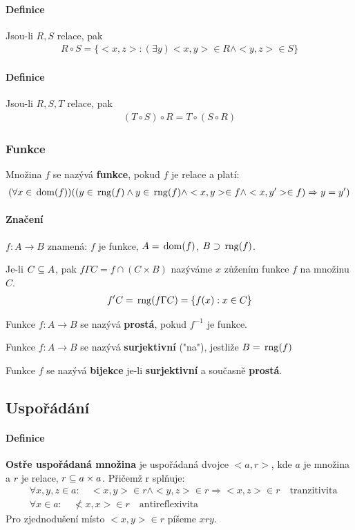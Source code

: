 \documentclass[a4paper,12pt,titlepage]{article}
\begin{document}
\paragraph{Definice}
Jsou-li $R, S$ relace, pak
\begin{align}
R \circ S = \{ <x,z> : (\exists y) <x,y> \in R \land <y,z> \in S \}
\end{align}
\paragraph{Definice}
Jsou-li $R, S, T$ relace, pak
\begin{align}
	(T \circ S) \circ R = T \circ (S \circ R)
\end{align}

\subsubsection{Funkce}
\setcounter{equation}{0}
Množina $f$ se nazývá \textbf{funkce}, pokud $f$ je relace a platí:
\begin{align}
	(\forall x \in \operatorname*{\,dom}(f))((y \in \operatorname*{\,rng}(f) \land y \in \operatorname*{\,rng}(f) \land <x,y> \in f
	\land <x,y'> \in f) \Rightarrow y = y')
\end{align}
\paragraph{Značení} $f: A \to B$ znamená: $f$ je funkce, $A = \operatorname*{\,dom}(f)$, $B \supset
\operatorname*{\,rng}(f)$.


Je-li $C \subseteq A$, pak $f \Gamma C = f \cap (C \times B)$ nazýváme $x$ zůžením funkce
$f$ na množinu $C$.
\begin{align}
f'C = \operatorname*{\,rng}(f \Gamma C) = \{ f(x): x \in C \}
\end{align}
\begin{description}
\item Funkce $f: A \to B$ se nazývá \textbf{prostá}, pokud $f^{-1}$ je funkce.
\item Funkce $f: A \to B$ se nazývá \textbf{surjektivní} ("na"), jestliže $B = \operatorname*{\,rng}(f)$
\item Funkce $f$ se nazývá \textbf{bijekce} je-li \textbf{surjektivní} a současně
\textbf{prostá}.
\end{description}


\subsection{Uspořádání}
\setcounter{equation}{0}
\paragraph{Definice}
\textbf{Ostře uspořádaná množina} je uspořádaná dvojce $<a, r>$, kde $a$ je
množina a $r$ je relace, $r \subseteq a \times a $. Přičemž r splňuje:
\begin{align}
	&\forall x, y, z \in a : \quad <x,y> \in r \land <y,z> \in r \Rightarrow
	<x,z> \in r \quad \text{tranzitivita} \\
	&\forall x \in a: \quad \not <x,x> \in r \quad \text{antireflexivita}
\end{align}
Pro zjednodušení místo $<x,y> \in r$ píšeme $x r y$.
\end{document}
